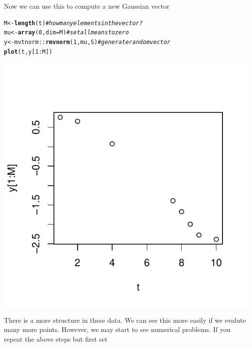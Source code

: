 \documentclass[a4paper,11pt]{article}\usepackage[]{graphicx}\usepackage[]{color}
\makeatletter
\def\maxwidth{ %
  \ifdim\Gin@nat@width>\linewidth
    \linewidth
  \else
    \Gin@nat@width
  \fi
}
\newcommand{\hlnum}[1]{\textcolor[rgb]{0.686,0.059,0.569}{#1}}%
\newcommand{\hlcom}[1]{\textcolor[rgb]{0.678,0.584,0.686}{\textit{#1}}}%
\newcommand{\hlopt}[1]{\textcolor[rgb]{0,0,0}{#1}}%
\newcommand{\hlstd}[1]{\textcolor[rgb]{0.345,0.345,0.345}{#1}}%
\newcommand{\hlkwb}[1]{\textcolor[rgb]{0.69,0.353,0.396}{#1}}%
\newcommand{\hlkwc}[1]{\textcolor[rgb]{0.333,0.667,0.333}{#1}}%
\newcommand{\hlkwd}[1]{\textcolor[rgb]{0.737,0.353,0.396}{\textbf{#1}}}%
\newenvironment{kframe}{%
 \def\at@end@of@kframe{}%
 \ifinner\ifhmode%
  \def\at@end@of@kframe{\end{minipage}}%
  \begin{minipage}{\columnwidth}%
 \fi\fi%
 \def\FrameCommand##1{\hskip\@totalleftmargin \hskip-\fboxsep
 \colorbox{shadecolor}{##1}\hskip-\fboxsep
     \hskip-\linewidth \hskip-\@totalleftmargin \hskip\columnwidth}%
 \MakeFramed {\advance\hsize-\width
   \@totalleftmargin\z@ \linewidth\hsize
   \@setminipage}}%
 {\par\unskip\endMakeFramed%
 \at@end@of@kframe}
\newenvironment{knitrout}{}{} %
\makeatother
\begin{document}
Now we can use this to compute a new Gaussian vector 

\begin{knitrout}
\color{fgcolor}\begin{kframe}
\begin{alltt}
  \hlstd{M} \hlkwb{<-} \hlkwd{length}\hlstd{(t)}                  \hlcom{# how many elements in the vector?}
  \hlstd{mu} \hlkwb{<-} \hlkwd{array}\hlstd{(}\hlnum{0}\hlstd{,} \hlkwc{dim}\hlstd{=M)}           \hlcom{# set all means to zero}
  \hlstd{y} \hlkwb{<-} \hlstd{mvtnorm}\hlopt{::}\hlkwd{rmvnorm}\hlstd{(}\hlnum{1}\hlstd{, mu, S)} \hlcom{# generate random vector}
  \hlkwd{plot}\hlstd{(t, y[}\hlnum{1}\hlopt{:}\hlstd{M])}
\end{alltt}
\end{kframe}

{\centering \includegraphics[width=\maxwidth]{figure/unnamed-chunk-13-1} 

}



\end{knitrout}

There is a more structure in these data. We can see this more easily if we evalute many more points. However, we may start to see numerical problems. If you repeat the above steps but first set
\end{document}
